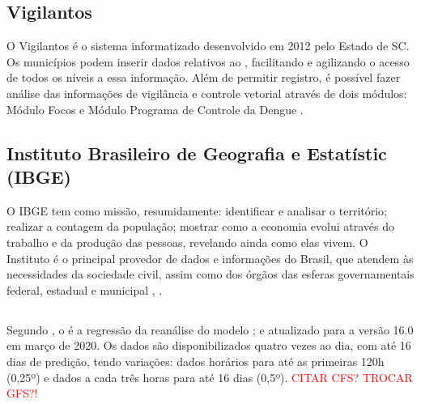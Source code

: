 \subsection{Vigilantos}

O Vigilantos é o sistema informatizado  desenvolvido em 2012 pelo Estado de \acrlong{SC}. Os municípios podem inserir dados relativos ao , facilitando e agilizando o acesso de todos os níveis a essa informação. Além de permitir registro, é possível fazer análise das informações de vigilância e controle vetorial através de dois módulos: Módulo Focos e Módulo Programa de Controle da Dengue \cite{Vigilantos}.

\subsection{Instituto Brasileiro de Geografia e Estatístic (IBGE)}

O \acrshort{IBGE} tem como missão, resumidamente: identificar e analisar o território; realizar a contagem da população; mostrar como a economia evolui através do trabalho e da produção das pessoas, revelando ainda como elas vivem.  O Instituto é o principal provedor de dados e informações do Brasil, que atendem às necessidades da sociedade civil, assim como dos órgãos das esferas governamentais federal, estadual e municipal \cite{IBGE22}, \cite{IBGE23prev}.



\subsection{}

\indent Segundo , o  é a regressão da reanálise do modelo ; e atualizado para a versão 16.0 em março de 2020. Os dados são disponibilizados quatro vezes ao dia, com até 16 dias de predição, tendo variações: dados horários para até as primeiras 120h (0,25º) e dados a cada três horas para até 16 dias (0,5º). \textcolor{red}{CITAR CFS? TROCAR GFS?!}

